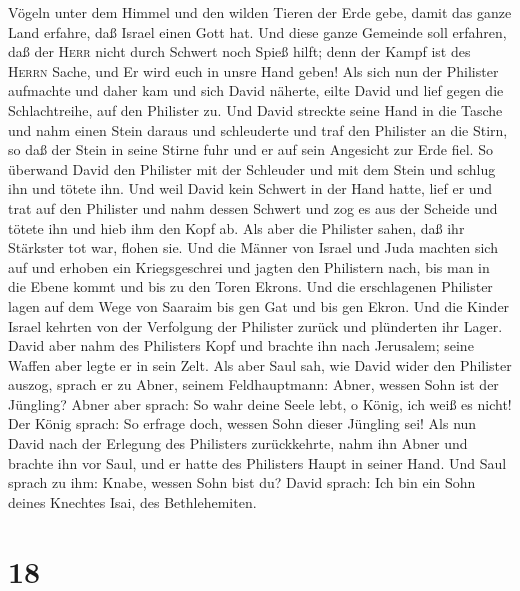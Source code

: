 Vögeln unter dem Himmel und den wilden Tieren der Erde gebe, damit das
ganze Land erfahre, daß Israel einen Gott hat.  Und diese
ganze Gemeinde soll erfahren, daß der \textsc{Herr} nicht durch Schwert
noch Spieß hilft; denn der Kampf ist des \textsc{Herrn} Sache, und Er
wird euch in unsre Hand geben!  Als sich nun der
Philister aufmachte und daher kam und sich David näherte, eilte David
und lief gegen die Schlachtreihe, auf den Philister zu. 
Und David streckte seine Hand in die Tasche und nahm einen Stein daraus
und schleuderte und traf den Philister an die Stirn, so daß der Stein in
seine Stirne fuhr und er auf sein Angesicht zur Erde fiel.
 So überwand David den Philister mit der Schleuder und
mit dem Stein und schlug ihn und tötete ihn.  Und weil
David kein Schwert in der Hand hatte, lief er und trat auf den Philister
und nahm dessen Schwert und zog es aus der Scheide und tötete ihn und
hieb ihm den Kopf ab.  Als aber die Philister sahen, daß
ihr Stärkster tot war, flohen sie. Und die Männer von Israel und Juda
machten sich auf und erhoben ein Kriegsgeschrei und jagten den
Philistern nach, bis man in die Ebene kommt und bis zu den Toren Ekrons.
Und die erschlagenen Philister lagen auf dem Wege von Saaraim bis gen
Gat und bis gen Ekron.  Und die Kinder Israel kehrten von
der Verfolgung der Philister zurück und plünderten ihr Lager.
 David aber nahm des Philisters Kopf und brachte ihn nach
Jerusalem; seine Waffen aber legte er in sein Zelt.  Als
aber Saul sah, wie David wider den Philister auszog, sprach er zu Abner,
seinem Feldhauptmann: Abner, wessen Sohn ist der Jüngling? Abner aber
sprach: So wahr deine Seele lebt, o König, ich weiß es nicht!
 Der König sprach: So erfrage doch, wessen Sohn dieser
Jüngling sei!  Als nun David nach der Erlegung des
Philisters zurückkehrte, nahm ihn Abner und brachte ihn vor Saul, und er
hatte des Philisters Haupt in seiner Hand.  Und Saul
sprach zu ihm: Knabe, wessen Sohn bist du? David sprach: Ich bin ein
Sohn deines Knechtes Isai, des Bethlehemiten.

\hypertarget{section-17}{%
\section{18}\label{section-17}}

